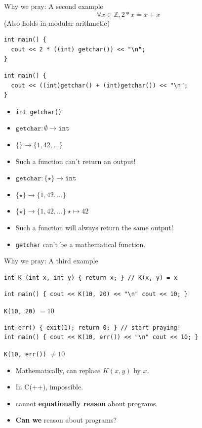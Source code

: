 \documentclass[8pt]{beamer}
\newcommand{\Z}{\mathbb Z}
\newcommand{\cpp}[1]{\texttt{#1}}
\begin{document}
\begin{frame}[fragile]{Why we pray: A second example}
\pause
$$ \forall x \in \Z, 2 * x = x + x$$
\pause
(Also holds in modular arithmetic)
\pause
\begin{verbatim}
int main() {
  cout << 2 * ((int) getchar()) << "\n";
}
\end{verbatim}
\pause

\begin{verbatim}
int main() {
  cout << ((int)getchar() + (int)getchar()) << "\n";
}
\end{verbatim}

\pause


\begin{itemize}
    \item \cpp{int getchar()} \pause
    \item $\texttt{getchar}: \emptyset \rightarrow \texttt{int}$ \pause
    \item $\{ \} \rightarrow \{ 1, 42, \dots \}$ \pause
    \item Such a function can't return an output! \pause
    \item $\texttt{getchar}: \{ \star \} \rightarrow \texttt{int}$ \pause
    \item $\{ \star \} \rightarrow \{ 1, 42, \dots \}$ \pause
    \item $\{ \star \} \rightarrow \{ 1, 42, \dots \}~ \star \mapsto 42$ \pause
    \item Such a function will always return the same output! \pause
    \item \texttt{getchar} can't be a mathematical function.
\end{itemize}

\pause

\end{frame}

\begin{frame}[fragile]{Why we pray: A third example}
\begin{verbatim}
int K (int x, int y) { return x; } // K(x, y) = x
\end{verbatim}
\pause
\begin{verbatim}
int main() { cout << K(10, 20) << "\n" cout << 10; }
\end{verbatim}
\pause
\cpp{K(10, 20)} $=  10$
\pause
\begin{verbatim}
int err() { exit(1); return 0; } // start praying!
int main() { cout << K(10, err()) << "\n" cout << 10; }
\end{verbatim}
\pause
\cpp{K(10, err())} $\neq 10$
\pause

\begin{itemize}
    \item Mathematically, can replace $K(x, y)$ by $x$. \pause
    \item In C(++), impossible. \pause
    \item cannot \textbf{equationally reason} about programs. \pause
    \item \textbf{Can we} reason about programs? \pause
\end{itemize}
\end{frame}
\end{document}
